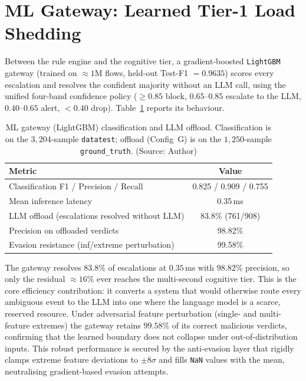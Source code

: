 \section{ML Gateway: Learned Tier-1 Load Shedding}
\label{sec:mlgate}
Between the rule engine and the cognitive tier, a gradient-boosted \texttt{LightGBM} gateway (trained on $\approx\!1$M flows, held-out Test-F1 $=0.9635$) scores every escalation and resolves the confident majority without an LLM call, using the unified four-band confidence policy ($\ge\!0.85$ block, $0.65$--$0.85$ escalate to the LLM, $0.40$--$0.65$ alert, $<\!0.40$ drop). Table~\ref{tab:mlgate} reports its behaviour.

\begin{table}[!htbp]
    \centering
    \caption{ML gateway (LightGBM) classification and LLM offload. Classification is on the $3{,}204$-sample \texttt{datatest}; offload (Config~G) is on the $1{,}250$-sample \texttt{ground\_truth}. (Source: Author)}
    \label{tab:mlgate}
    \begin{tabular}{|l|c|}
        \hline
        \textbf{Metric} & \textbf{Value} \\ \hline
        Classification F1 / Precision / Recall & 0.825 / 0.909 / 0.755 \\ \hline
        Mean inference latency & 0.35\,ms \\ \hline
        LLM offload (escalations resolved without LLM) & 83.8\% (761/908) \\ \hline
        Precision on offloaded verdicts & 98.82\% \\ \hline
        Evasion resistance (inf/extreme perturbation) & 99.58\% \\ \hline
    \end{tabular}
\end{table}

The gateway resolves $83.8\%$ of escalations at $0.35$\,ms with $98.82\%$ precision, so only the residual $\approx\!16\%$ ever reaches the multi-second cognitive tier. This is the core efficiency contribution: it converts a system that would otherwise route every ambiguous event to the LLM into one where the language model is a scarce, reserved resource. Under adversarial feature perturbation (single- and multi-feature extremes) the gateway retains $99.58\%$ of its correct malicious verdicts, confirming that the learned boundary does not collapse under out-of-distribution inputs. This robust performance is secured by the anti-evasion layer that rigidly clamps extreme feature deviations to $\pm8\sigma$ and fills \texttt{NaN} values with the mean, neutralising gradient-based evasion attempts.

